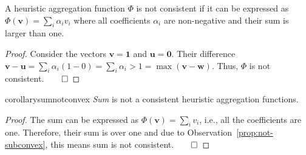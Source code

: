 \documentclass[smallextended]{svjour3}       %
\newcommand{\axiomcons}{consistent\xspace}
\newcommand{\vect}[1]{\mathbf{#1}}
\begin{document}
\begin{proposition}
  \label{prop:not-subconvex}
  A heuristic aggregation function $\Phi$ is not \axiomcons if it can be expressed as $\Phi(\vect{v})=\sum_i \alpha_i v_i$ where all coefficients $\alpha_i$ are non-negative and their sum is larger than one.
\end{proposition}
\begin{proof}
    Consider the vectors $\vect{v} = \vect{1}$ and $\vect{u} = \vect{0}$. Their difference  	
	$\vect{v} - \vect{u} = \sum_i \alpha_i (1 - 0) = \sum_i \alpha_i > 1 = \max (\vect{v} - \vect{w})$. Thus, $\Phi$ is not \axiomcons.$\qed$
\end{proof}


\begin{restatable}{corollary}{sumnotconvex}
\emph{Sum} is not a \axiomcons heuristic aggregation functions.
\label{cor:sum-not-cons}
\end{restatable}
\begin{proof}
The sum can be expressed as $\Phi(\vect{v})=\sum_i v_i$, i.e., all the coefficients are one. Therefore, their sum is over one and due to Observation~\ref{prop:not-subconvex}, this means sum is not \axiomcons.$\qed$
\end{proof}
\end{document}
